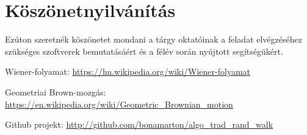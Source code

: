 \documentclass[a4paper, 12pt]{article}
\numberwithin{equation}{section}          %
\numberwithin{figure}{subsection}
\begin{document}

	\clearpage \vspace*{2cm}
	\setcounter{secnumdepth}{0}
 
	\section{Köszönetnyilvánítás}
	
		Ezúton szeretnék köszönetet mondani a tárgy oktatóinak a feladat elvégzéséhez szükséges
		szoftverek bemutatásáért és a félév során nyújtott segítségükért.
	
	
	\newpage \vspace*{2cm}
	
	
	\begin{thebibliography}{9}
		
		 Wiener-folyamat:
			\url{https://hu.wikipedia.org/wiki/Wiener-folyamat}
		
		 Geometriai Brown-mozgás:
		 	\url{https://en.wikipedia.org/wiki/Geometric_Brownian_motion}
		
		 Github projekt: \url{http://github.com/bonamarton/algo_trad_rand_walk}
		
	\end{thebibliography}

		
\end{document}
